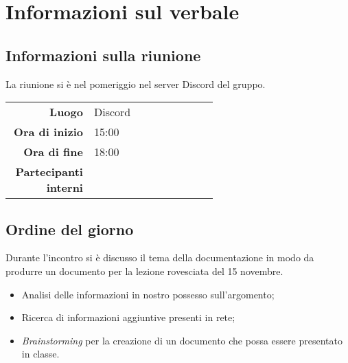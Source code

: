 \section{Informazioni sul verbale}

\subsection{Informazioni sulla riunione}
La riunione si è nel pomeriggio nel server Discord del gruppo.

\begin{center}
	\begin{tabular}{r|p{0.6\linewidth}}
		\toprule
		\textbf{Luogo} & Discord \\
		\textbf{Ora di inizio} & 15:00 \\
		\textbf{Ora di fine} & 18:00 \\
		\textbf{Partecipanti interni} & \groupTeam
	\end{tabular}
\end{center}

\medskip

\subsection{Ordine del giorno}
Durante l'incontro si è discusso il tema della documentazione in modo da produrre un documento per la lezione rovesciata del 15 novembre.
\begin{itemize}
	\item Analisi delle informazioni in nostro possesso sull'argomento;
	\item Ricerca di informazioni aggiuntive presenti in rete;
	\item \textit{Brainstorming} per la creazione di un documento che possa essere presentato in classe.
\end{itemize}
